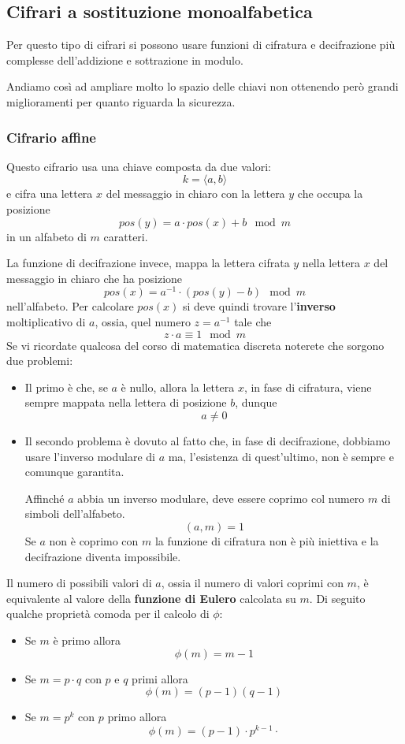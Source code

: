 \subsection{Cifrari a sostituzione monoalfabetica}
Per questo tipo di cifrari si possono usare funzioni di cifratura e decifrazione pi\`u complesse dell'addizione e
sottrazione in modulo.

Andiamo cos\`i ad ampliare molto lo spazio delle chiavi non ottenendo per\`o grandi  miglioramenti per quanto
riguarda la sicurezza.

\subsubsection{Cifrario affine}
Questo cifrario usa una chiave composta da due valori:
\[ k = \langle a, b \rangle \]
e cifra una lettera $x$ del messaggio in chiaro con la lettera $y$ che occupa la posizione
\[ pos(y) = a \cdot pos(x) + b \mod{m} \]
in un alfabeto di $m$ caratteri.

La funzione di decifrazione invece, mappa la lettera cifrata $y$ nella lettera $x$ del messaggio in chiaro che ha
posizione
\[ pos(x) = a^{-1} \cdot (pos(y) - b) \mod{m} \]
nell'alfabeto. Per calcolare $pos(x)$ si deve quindi trovare l'\textbf{inverso} moltiplicativo di $a$, ossia, quel
numero $z = a^{-1}$ tale che
\[ z \cdot a \equiv 1 \mod{m} \]
Se vi ricordate qualcosa del corso di matematica discreta noterete che sorgono due problemi:
\begin{itemize}
	\item Il primo \`e che, se $a$ \`e nullo, allora la lettera $x$, in fase di cifratura, viene sempre mappata nella
	      lettera di posizione $b$, dunque 
		  \[ a \neq 0 \]
	\item Il secondo problema \`e dovuto al fatto che, in fase di decifrazione, dobbiamo usare l'inverso modulare di $a$
	      ma, l'esistenza di quest'ultimo, non \`e sempre e comunque garantita.

	      Affinch\'e $a$ abbia un inverso modulare, deve essere coprimo col numero $m$ di simboli dell'alfabeto.
		  \[ (a, m) = 1 \] 
		  Se $a$ non \`e coprimo con $m$ la funzione di cifratura non \`e pi\`u iniettiva e la decifrazione 
		  diventa impossibile.
\end{itemize}
Il numero di possibili valori di $a$, ossia il numero di valori coprimi con $m$, \`e equivalente al valore della
\textbf{funzione di Eulero} calcolata su $m$. Di seguito qualche propriet\`a comoda per il calcolo di $\phi$:
\begin{itemize}
	\item Se $m$ \`e primo allora
	      \[ \phi(m) = m - 1 \]
	\item Se $m = p \cdot q$ con $p$ e $q$ primi allora
	      \[ \phi(m) = (p - 1)(q - 1) \]
	\item Se $m = p^{k}$ con $p$ primo allora
	      \[ \phi(m) = (p - 1) \cdot p^{k-1} \cdot  \]
\end{itemize}

